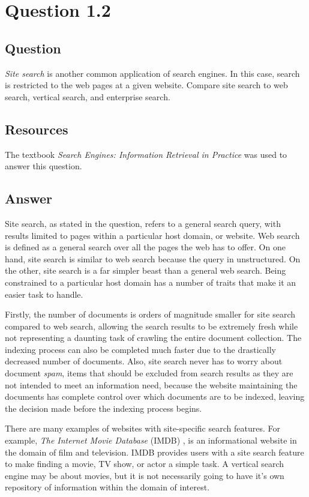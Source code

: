 \section{Question 1.2}


\subsection{Question}
\textit{Site search} is another common application of search engines. In this case, search is restricted to the web pages at a given website. Compare site search to web search, vertical search, and enterprise search.


\subsection{Resources}
The textbook \textit{Search Engines: Information Retrieval in Practice} \cite{seirip} was used to answer this question.


\subsection{Answer}
Site search, as stated in the question, refers to a general search query, with results limited to pages within a particular host domain, or website.  Web search is defined as a general search over all the pages the web has to offer.  On one hand, site search is similar to web search because the query in unstructured.  On the other, site search is a far simpler beast than a general web search.  Being constrained to a particular host domain has a number of traits that make it an easier task to handle.

Firstly, the number of documents is orders of magnitude smaller for site search compared to web search, allowing the search results to be extremely fresh while not representing a daunting task of crawling the entire document collection.  The indexing process can also be completed much faster due to the drastically decreased number of documents.  Also, site search never has to worry about document \textit{spam}, items that should be excluded from search results as they are not intended to meet an information need, because the website maintaining the documents has complete control over which documents are to be indexed, leaving the decision made before the indexing process begins.

There are many examples of websites with site-specific search features.  For example, \textit{The Internet Movie Database} (IMDB) \cite{imdb}, is an informational website in the domain of film and television.  IMDB provides users with a site search feature to make finding a movie, TV show, or actor a simple task.  A vertical search engine may be about movies, but it is not necessarily going to have it's own repository of information within the domain of interest.


